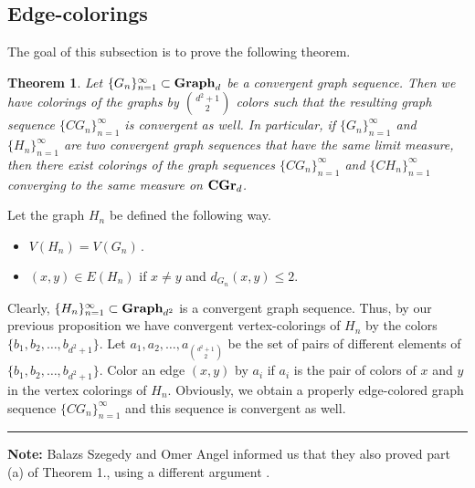 \documentclass{article}
\newtheorem{theorem}{Theorem}
\newcommand{\Gd}[1][d]{\textrm{\textbf{Graph}}_{#1}}
\newcommand{\CGrd}[1][d]{\textrm{\textbf{CGr}}_{#1}}
\def\proof{\smallskip\noindent{\it Proof.} }
\newcommand{\qed} {\hspace {0.1in} \rule {1.5mm} {3.5mm}}
\begin{document}
\subsection{Edge-colorings}
The goal of this subsection is to prove the following theorem.
\begin{theorem} \label{theorem2}
Let $\{G_n\}^\infty_{n=1}\subset \Gd $
be a convergent graph sequence. Then we have colorings of
the graphs by ${d^2+1 \choose 2}$ colors such that the resulting
graph sequence $\{CG_n\}^\infty_{n=1}$ is convergent as well.
In particular, if $\{G_n\}^\infty_{n=1}$ and $\{H_n\}^\infty_{n=1}$ are
two convergent graph sequences that have the same limit measure, then
there exist colorings of the graph sequences $\{CG_n\}^\infty_{n=1}$ 
and $\{CH_n\}^\infty_{n=1}$ converging to the same measure on $\CGrd$.
\end{theorem}
\proof Let the graph $H_n$ be defined the following way.
\begin{itemize}
\item $V(H_n)=V(G_n)\,.$
\item $(x,y)\in E(H_n)$ if $x\neq y$ and $d_{G_n}(x,y)\leq 2$.
\end{itemize}
Clearly, $\{H_n\}^\infty_{n=1}\subset {\bf Graph}_{d^2}$ is a convergent
graph sequence. Thus, by our previous proposition we have convergent
vertex-colorings of $H_n$ by the colors $\{b_1,b_2,\dots, b_{d^2+1}\}$.
Let $a_1,a_2,\dots,a_{{d^2+1 \choose 2}}$ be the set of pairs 
of different elements
of $\{b_1,b_2,\dots, b_{d^2+1}\}$. Color an edge $(x,y)$ by $a_i$ if
$a_i$ is the pair of colors of $x$ and $y$ in the vertex colorings of $H_n$.
Obviously, we obtain a properly edge-colored graph sequence 
$\{CG_n\}^\infty_{n=1}$ and this sequence is convergent as well. \qed

\vskip 0.2in
\noindent
{\bf Note:} Balazs Szegedy and Omer Angel informed
us that they also proved part (a)
of Theorem 1., using a different argument \cite{Bal}.
\end{document}
